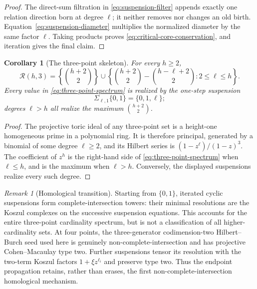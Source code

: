 \documentclass[11pt,reqno]{amsart}
\newtheorem{corollary}[theorem]{Corollary}
\theoremstyle{definition}
\theoremstyle{remark}
\newtheorem{remark}[theorem]{Remark}
\newcommand{\Rcal}{\mathcal R}
\begin{document}
\begin{proof}
The direct-sum filtration in \eqref{eq:suspension-filter} appends exactly one
relation direction born at degree $\ell$; it neither removes nor changes an
old birth.  Equation~\eqref{eq:suspension-diameter} multiplies the normalized
diameter by the same factor $\ell$.  Taking products proves
\eqref{eq:critical-core-conservation}, and iteration gives the final claim.
\end{proof}

\begin{corollary}[The three-point skeleton]
\label{cor:three-point-suspension-skeleton}
For every $h\geq2$,
\begin{equation}\label{eq:three-point-spectrum}
 \Rcal(h,3)
 =\left\{\binom{h+2}{2}\right\}
 \cup
 \left\{
  \binom{h+2}{2}-\binom{h-\ell+2}{2}:2\leq\ell\leq h
 \right\}.
\end{equation}
Every value in \eqref{eq:three-point-spectrum} is realized by the one-step
suspension
\[
 \Sigma_{\ell,1}\{0,1\}=\{0,1,\ell\};
\]
degrees $\ell>h$ all realize the maximum $\binom{h+2}{2}$.
\end{corollary}

\begin{proof}
The projective toric ideal of any three-point set is a height-one homogeneous
prime in a polynomial ring.  It is therefore principal, generated by a
binomial of some degree $\ell\geq2$, and its Hilbert series is
$(1-z^\ell)/(1-z)^3$.  The coefficient of $z^h$ is the right-hand side of
\eqref{eq:three-point-spectrum} when $\ell\leq h$, and is the maximum when
$\ell>h$.  Conversely, the displayed suspensions realize every such degree.
\end{proof}

\begin{remark}[Homological transition]
\label{rem:suspension-homological-transition}
Starting from $\{0,1\}$, iterated cyclic suspensions form
complete-intersection towers: their minimal resolutions are the Koszul
complexes on the successive suspension equations.  This accounts for the
entire three-point cardinality spectrum, but is not a classification of all
higher-cardinality sets.  At four points, the three-generator
codimension-two Hilbert--Burch seed used here is genuinely
non-complete-intersection
and has projective Cohen--Macaulay type two.  Further suspensions tensor its
resolution with the two-term Koszul factors
$1+\xi z^{\ell_i}$ and preserve type two.  Thus the endpoint propagation
retains, rather than erases, the first non-complete-intersection homological
mechanism.
\end{remark}
\end{document}
